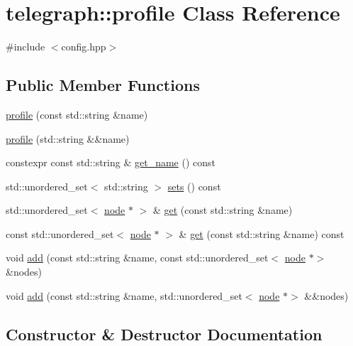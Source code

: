 \hypertarget{classtelegraph_1_1profile}{}\section{telegraph\+:\+:profile Class Reference}
\label{classtelegraph_1_1profile}


{\ttfamily \#include $<$config.\+hpp$>$}

\subsection*{Public Member Functions}
\begin{DoxyCompactItemize}
\item 
\hyperlink{classtelegraph_1_1profile_a1c7b4b5e358b6210ad30410e65d921c4}{profile} (const std\+::string \&name)
\item 
\hyperlink{classtelegraph_1_1profile_adfe111d01fccdfad856ff27abf5c9959}{profile} (std\+::string \&\&name)
\item 
constexpr const std\+::string \& \hyperlink{classtelegraph_1_1profile_a93aee808f8bcec2ed60d2ab62a4a8249}{get\+\_\+name} () const
\item 
std\+::unordered\+\_\+set$<$ std\+::string $>$ \hyperlink{classtelegraph_1_1profile_aca410ddfb17eb8905541d28f668c4b9d}{sets} () const
\item 
std\+::unordered\+\_\+set$<$ \hyperlink{classtelegraph_1_1node}{node} $\ast$ $>$ \& \hyperlink{classtelegraph_1_1profile_ae55ca8f3458bc9a7b29b94320e11a075}{get} (const std\+::string \&name)
\item 
const std\+::unordered\+\_\+set$<$ \hyperlink{classtelegraph_1_1node}{node} $\ast$ $>$ \& \hyperlink{classtelegraph_1_1profile_ae815f4b8ed9bbde85fbccc48b730fadd}{get} (const std\+::string \&name) const
\item 
void \hyperlink{classtelegraph_1_1profile_ad3b7efc2c78486ded407d9f7d77c63ad}{add} (const std\+::string \&name, const std\+::unordered\+\_\+set$<$ \hyperlink{classtelegraph_1_1node}{node} $\ast$$>$ \&nodes)
\item 
void \hyperlink{classtelegraph_1_1profile_a8855f4f0091aae625de7c5eae4f548bf}{add} (const std\+::string \&name, std\+::unordered\+\_\+set$<$ \hyperlink{classtelegraph_1_1node}{node} $\ast$$>$ \&\&nodes)
\end{DoxyCompactItemize}


\subsection{Constructor \& Destructor Documentation}
\mbox{\label{classtelegraph_1_1profile_a1c7b4b5e358b6210ad30410e65d921c4}} 
